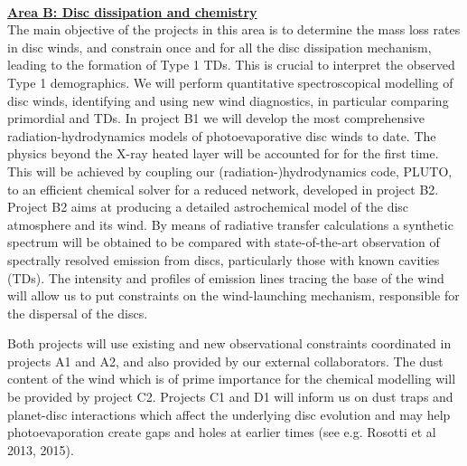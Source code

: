 \documentclass[10pt,fleqn,twoside]{article}
\newcommand{\AreacolB}{\color{Green}}
\begin{document}
%



\
\mbox{}\vspace{1em}\\
\noindent\underline{\bf\AreacolB Area B: Disc dissipation and chemistry }\\
\noindent The main objective of the projects in this area is to
determine the mass loss rates in disc winds, and constrain once and
for all the disc dissipation mechanism, leading to the formation of
Type 1 TDs. This is crucial to interpret the observed Type 1
demographics. We will perform quantitative spectroscopical modelling
of disc winds, identifying and using new wind diagnostics, in
particular comparing primordial and TDs. In project B1 we will develop
the most comprehensive radiation-hydrodynamics models of
photoevaporative disc winds to date. The physics beyond the X-ray
heated layer will be accounted for for the first time. This will be
achieved by coupling our  (radiation-)hydrodynamics code, PLUTO, to an efficient 
chemical solver for a reduced network,
developed in project B2. Project B2 aims at producing a detailed astrochemical model of the
disc atmosphere and its wind. By means of radiative transfer
calculations a synthetic spectrum will be obtained to be compared with
state-of-the-art observation of spectrally resolved emission from
discs, particularly those with known cavities (TDs). The intensity and
profiles of emission lines tracing the base of the wind will allow us
to put constraints on the wind-launching mechanism, responsible for
the dispersal of the discs.  

Both projects will use existing and new observational
constraints coordinated in projects A1 and A2, and also provided by
our external collaborators. The dust 
content of the wind which is of prime importance for the chemical
modelling will be provided by project C2. Projects C1 and D1 will
inform us on dust traps and 
planet-disc
interactions which affect the underlying disc evolution and may help
photoevaporation create gaps and holes at 
earlier times (see e.g. Rosotti et al 2013, 2015).\\ 
\end{document}
